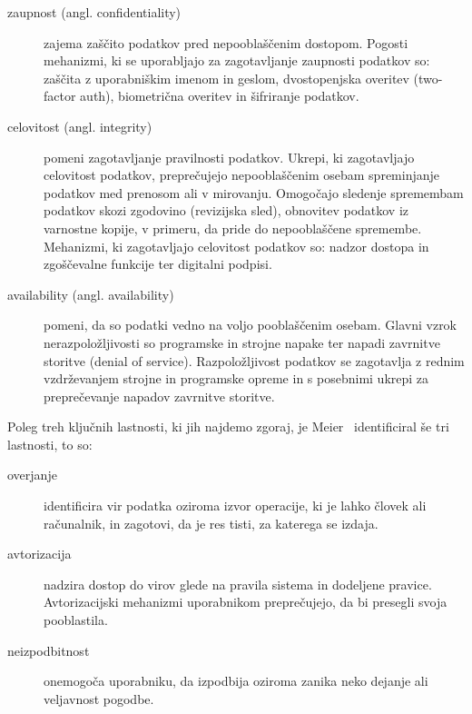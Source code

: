 \documentclass[12pt,a4paper,openany,tikz]{book}
\theoremstyle{plain}
\theoremstyle{definition}
\begin{document}
\begin{description}
\item[\Gls{zaupnost} (angl. confidentiality)] zajema zaščito podatkov pred nepooblaščenim dostopom. Pogosti mehanizmi, ki se uporabljajo za zagotavljanje zaupnosti podatkov so: zaščita z uporabniškim imenom in geslom, dvostopenjska overitev (two-factor auth), biometrična overitev in šifriranje podatkov.

\item[\Gls{celovitost} (angl. integrity)] pomeni zagotavljanje pravilnosti podatkov. Ukrepi, ki zagotavljajo celovitost podatkov, preprečujejo nepooblaščenim osebam spreminjanje podatkov med prenosom ali v mirovanju. Omogočajo sledenje spremembam podatkov skozi zgodovino (revizijska sled), obnovitev podatkov iz varnostne kopije, v primeru, da pride do nepooblaščene spremembe. Mehanizmi, ki zagotavljajo celovitost podatkov so: nadzor dostopa in zgoščevalne funkcije ter digitalni podpisi.

\item[\Gls{availability} (angl. availability)] pomeni, da so podatki vedno na voljo pooblaščenim osebam. Glavni vzrok nerazpoložljivosti so programske in strojne napake ter napadi zavrnitve storitve (denial of service). Razpoložljivost podatkov se zagotavlja z rednim vzdrževanjem strojne in programske opreme in s posebnimi ukrepi za preprečevanje napadov zavrnitve storitve.

\end{description}

\noindent
Poleg treh ključnih lastnosti, ki jih najdemo zgoraj, je Meier~\cite{meier2003improving} identificiral še tri lastnosti, to so:

\begin{description}

\item[\Gls{overjanje}] identificira vir podatka oziroma izvor operacije, ki je lahko človek ali računalnik, in zagotovi, da je res tisti, za katerega se izdaja.

\item[\Gls{avtorizacija}] nadzira dostop do virov glede na pravila sistema in dodeljene pravice. Avtorizacijski mehanizmi uporabnikom preprečujejo, da bi presegli svoja pooblastila.

\item[\Gls{neizpodbitnost}] onemogoča uporabniku, da izpodbija oziroma zanika neko dejanje ali veljavnost pogodbe.

\end{description}
\end{document}
